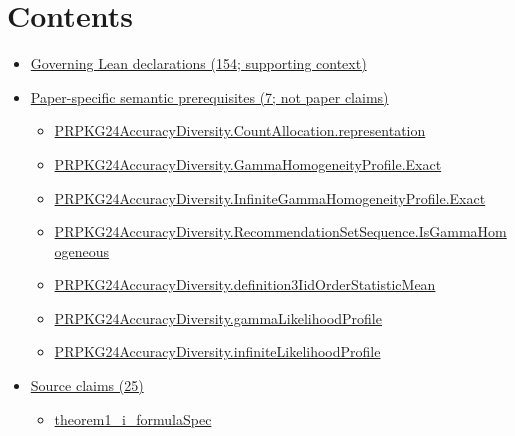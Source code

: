 \documentclass[10pt]{article}
\begin{document}
\section*{Contents}
\begin{itemize}[leftmargin=1.2em]
\item \hyperlink{governing-declaration-section-5ef5ef0364b6939c}{Governing Lean declarations (154; supporting context)}
\item \hyperlink{paper-prerequisite-section-5ef5ef0364b6939c}{Paper-specific semantic prerequisites (7; not paper claims)}
\begin{itemize}[leftmargin=1.2em]
\item \hyperlink{paper-prerequisite-29fb13a9ce74aef5}{PRPKG24\allowbreak{}Accuracy\allowbreak{}Diversity.\allowbreak{}Count\allowbreak{}Allocation.\allowbreak{}representation}
\item \hyperlink{paper-prerequisite-89d4ec041bc132b6}{PRPKG24\allowbreak{}Accuracy\allowbreak{}Diversity.\allowbreak{}Gamma\allowbreak{}Homogeneity\allowbreak{}Profile.\allowbreak{}Exact}
\item \hyperlink{paper-prerequisite-91ccf3df6a31f41a}{PRPKG24\allowbreak{}Accuracy\allowbreak{}Diversity.\allowbreak{}Infinite\allowbreak{}Gamma\allowbreak{}Homogeneity\allowbreak{}Profile.\allowbreak{}Exact}
\item \hyperlink{paper-prerequisite-f3d17537ee262027}{PRPKG24\allowbreak{}Accuracy\allowbreak{}Diversity.\allowbreak{}Recommendation\allowbreak{}Set\allowbreak{}Sequence.\allowbreak{}Is\allowbreak{}Gamma\allowbreak{}Homogeneous}
\item \hyperlink{paper-prerequisite-62a80495e02812f6}{PRPKG24\allowbreak{}Accuracy\allowbreak{}Diversity.\allowbreak{}definition3\allowbreak{}Iid\allowbreak{}Order\allowbreak{}Statistic\allowbreak{}Mean}
\item \hyperlink{paper-prerequisite-150779389af71b90}{PRPKG24\allowbreak{}Accuracy\allowbreak{}Diversity.\allowbreak{}gamma\allowbreak{}Likelihood\allowbreak{}Profile}
\item \hyperlink{paper-prerequisite-bfb02fb80c6bf7e1}{PRPKG24\allowbreak{}Accuracy\allowbreak{}Diversity.\allowbreak{}infinite\allowbreak{}Likelihood\allowbreak{}Profile}
\end{itemize}
\item \hyperlink{source-section-f10b5f68e4acf3dc}{Source claims (25)}
\begin{itemize}[leftmargin=1.2em]
\item \hyperlink{source-claim-f5a7e9fe26a022aa}{theorem1\_\allowbreak{}i\_\allowbreak{}formula\allowbreak{}Spec}

\end{itemize}
\end{itemize}
\end{document}
